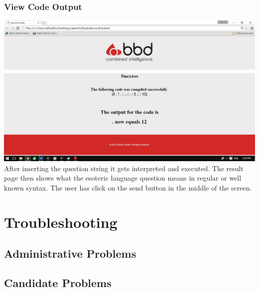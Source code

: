 \documentclass[english]{article}
\begin{document}
			\subsubsection{View Code Output}
				\includegraphics[width=\linewidth]{outResults.jpg}
				After inserting the question string it gets interpreted and executed. The result page then shows what the esoteric language question means in regular or well known syntax. The user has click on the send button in the middle of the screen.
		
	\section{Troubleshooting}
		\subsection{Administrative Problems}
		\subsection{Candidate Problems}
		
\end{document}
